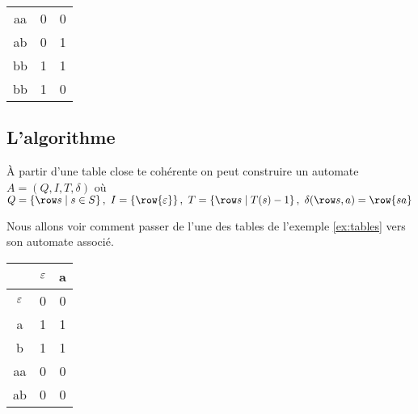 \begin{exemple}
\begin{itemize}
\begin{center}
\begin{tabular}{c|c|c}
				      aa         & 0          & 0 \\
				      ab         & 0          & 1 \\
				      bb         & 1          & 1 \\
				      bb         & 1          & 0 \\
			      \end{tabular}
		      \end{center}
	\end{itemize}
\end{exemple}


\subsection{L'algorithme}

\begin{theorem}
	À partir d'une table close te cohérente on peut construire un automate $A = (Q,I,T,\delta)$ où
	$Q = \setdef {\row s} {s \in S}, \ I = \set {\row{\motvide}}, \ T = \setdef {\row s} {T(s) -1}, \ \delta (\row s, a)  = \row{sa}$
\end{theorem}

\begin{exemple}
	Nous allons voir comment passer de l'une des tables de l'exemple \ref{ex:tables} vers son automate associé.\\
	\begin{minipage}{0.5\textwidth}
		\centering
		\begin{tabular}{c|c|c}
			           & $\varepsilon$ & a \\ \hline
			$\varepsilon$ & 0          & 0 \\
			a          & 1          & 1 \\ \hline

			b          & 1          & 1 \\
			aa         & 0          & 0 \\
			ab         & 0          & 0 \\
		\end{tabular}
	\end{minipage}
	\begin{minipage}{0.5\textwidth}
		\centering
	\end{minipage}
\end{exemple}

